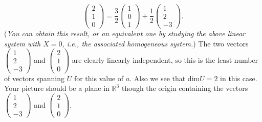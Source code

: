 \begin{enumerate}
\[
\begin{pmatrix}2\\1\\0\end{pmatrix}=\frac32\begin{pmatrix}1\\0\\1\end{pmatrix}+\frac12\begin{pmatrix}1\\2\\-3\end{pmatrix}.
\]
({\itshape You can obtain this result, or an equivalent one by studying the above linear system with $X=0$, i.e., the associated homogeneous system.}) The two vectors $\begin{pmatrix}1\\2\\-3\end{pmatrix}$ and $\begin{pmatrix}2\\1\\0\end{pmatrix}$ are clearly linearly independent,
so this is the least number of vectors spanning $U$ for this value of $a$. Also we see that dim$U=2$ in this case. Your picture should be
a plane in ${\mathbb R}^3$ though the origin  containing the vectors $\begin{pmatrix}1\\2\\-3\end{pmatrix}$ and $\begin{pmatrix}2\\1\\0\end{pmatrix}$.


\end{enumerate}
